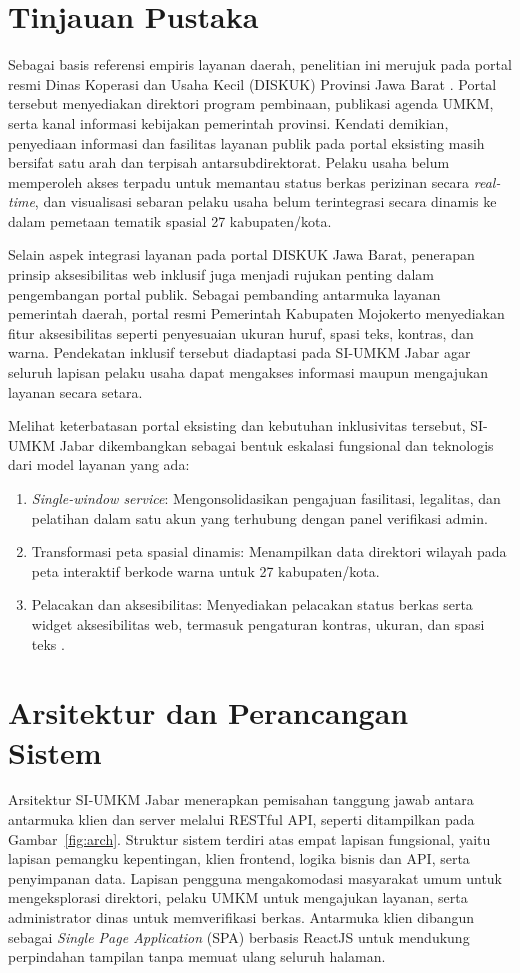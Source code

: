 \documentclass[conference]{IEEEtran}
\begin{document}
\section{Tinjauan Pustaka}
Sebagai basis referensi empiris layanan daerah, penelitian ini merujuk pada portal resmi Dinas Koperasi dan Usaha Kecil (DISKUK) Provinsi Jawa Barat \cite{b8}. Portal tersebut menyediakan direktori program pembinaan, publikasi agenda UMKM, serta kanal informasi kebijakan pemerintah provinsi. Kendati demikian, penyediaan informasi dan fasilitas layanan publik pada portal eksisting masih bersifat satu arah dan terpisah antarsubdirektorat. Pelaku usaha belum memperoleh akses terpadu untuk memantau status berkas perizinan secara \textit{real-time}, dan visualisasi sebaran pelaku usaha belum terintegrasi secara dinamis ke dalam pemetaan tematik spasial 27 kabupaten/kota.

Selain aspek integrasi layanan pada portal DISKUK Jawa Barat, penerapan prinsip aksesibilitas web inklusif juga menjadi rujukan penting dalam pengembangan portal publik. Sebagai pembanding antarmuka layanan pemerintah daerah, portal resmi Pemerintah Kabupaten Mojokerto \cite{b9} menyediakan fitur aksesibilitas seperti penyesuaian ukuran huruf, spasi teks, kontras, dan warna. Pendekatan inklusif tersebut diadaptasi pada SI-UMKM Jabar agar seluruh lapisan pelaku usaha dapat mengakses informasi maupun mengajukan layanan secara setara.

Melihat keterbatasan portal eksisting dan kebutuhan inklusivitas tersebut, SI-UMKM Jabar dikembangkan sebagai bentuk eskalasi fungsional dan teknologis dari model layanan yang ada:
\begin{enumerate}
    \item \textit{Single-window service}: Mengonsolidasikan pengajuan fasilitasi, legalitas, dan pelatihan dalam satu akun yang terhubung dengan panel verifikasi admin.
    \item Transformasi peta spasial dinamis: Menampilkan data direktori wilayah pada peta interaktif berkode warna untuk 27 kabupaten/kota.
    \item Pelacakan dan aksesibilitas: Menyediakan pelacakan status berkas serta widget aksesibilitas web, termasuk pengaturan kontras, ukuran, dan spasi teks \cite{b9}.
\end{enumerate}

\section{Arsitektur dan Perancangan Sistem}
Arsitektur SI-UMKM Jabar menerapkan pemisahan tanggung jawab antara antarmuka klien dan server melalui RESTful API, seperti ditampilkan pada Gambar~\ref{fig:arch}. Struktur sistem terdiri atas empat lapisan fungsional, yaitu lapisan pemangku kepentingan, klien frontend, logika bisnis dan API, serta penyimpanan data. Lapisan pengguna mengakomodasi masyarakat umum untuk mengeksplorasi direktori, pelaku UMKM untuk mengajukan layanan, serta administrator dinas untuk memverifikasi berkas. Antarmuka klien dibangun sebagai \textit{Single Page Application} (SPA) berbasis ReactJS untuk mendukung perpindahan tampilan tanpa memuat ulang seluruh halaman.
\end{document}
